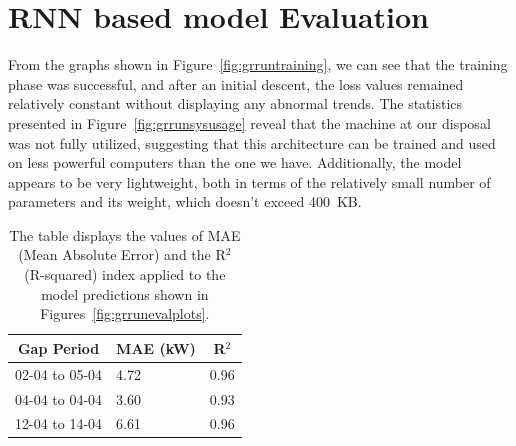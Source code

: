 
\section{RNN based model Evaluation}
From the graphs shown in Figure~\ref{fig:grruntraining},
we can see that the training phase was successful,
and after an initial descent, the loss values remained relatively
constant without displaying any abnormal trends.
The statistics presented in Figure~\ref{fig:grrunsysusage} reveal
that the machine at our disposal was not fully utilized,
suggesting that this architecture can be trained and used on
less powerful computers than the one we have.
Additionally, the model appears to be very lightweight, both in terms
of the relatively small number of parameters and its weight,
which doesn't exceed 400~KB.


\begin{table}[H]
	\begin{center}
		\begin{tabular}[c]{l|l|l}
			\multicolumn{1}{c|}{\textbf{Gap Period}} &
			\multicolumn{1}{c|}{\textbf{MAE (kW)}}   &
			\multicolumn{1}{c}{\textbf{R}$^2$}                     \\
			\hline

			02-04 to 05-04                           & 4.72 & 0.96 \\
			04-04 to 04-04                           & 3.60 & 0.93 \\
			12-04 to 14-04                           & 6.61 & 0.96
		\end{tabular}
	\end{center}
	\caption{The table displays the values of MAE (Mean Absolute Error) and the R$^2$ (R-squared) index applied to the model predictions shown in Figures~\ref{fig:grrunevalplots}.}
\end{table}

